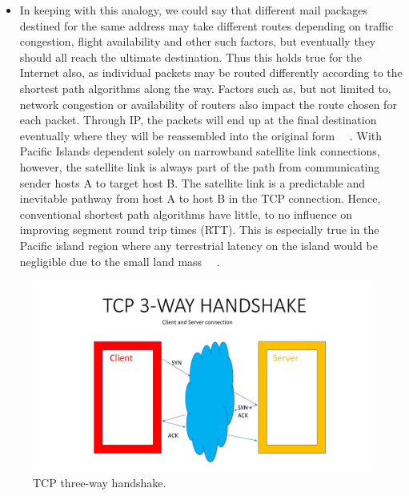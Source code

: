 \begin{itemize}
\item In keeping with this analogy, we could say that different mail packages destined for the same address may take different routes depending on traffic congestion, flight availability and other such factors, but eventually they should all reach the ultimate destination. Thus this holds true for the Internet also, as individual packets may be routed differently according to the shortest path algorithms along the way. Factors such as, but not limited to, network congestion or availability of routers also impact the route chosen for each packet. Through IP, the packets will end up at the final destination eventually where they will be reassembled into the original form ~\cite{1}~\cite{2}. With Pacific Islands dependent solely on narrowband satellite link connections, however, the satellite link is always part of the path from communicating sender hosts A to target host B. The satellite link is a predictable and inevitable pathway from host A to host B in the TCP connection. Hence, conventional shortest path algorithms have little, to no influence on improving segment round trip times (RTT). This is especially true in the Pacific island region where any terrestrial latency on the island would be negligible due to the small land mass ~\cite{4}~\cite{5}.

\end{itemize}

\begin{figure}[h]
    \centering
    \includegraphics[width=1.0\textwidth]{3way.pdf}
    \caption{TCP three-way handshake. }
    \label{3way}
\end{figure}


